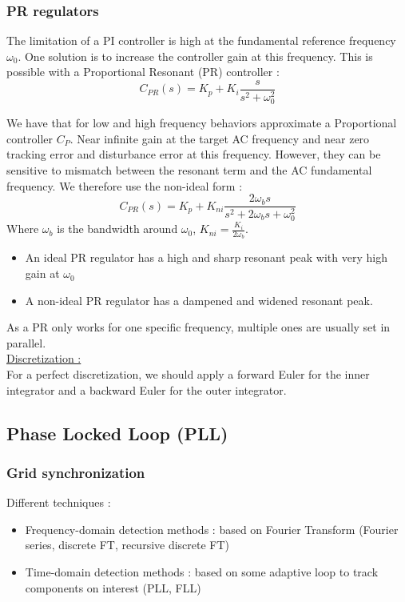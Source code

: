 \documentclass[../main.tex]{subfiles}
\begin{document}
\subsubsection{PR regulators}
The limitation of a PI controller is high at the fundamental reference frequency $\omega_0$. One solution is to increase the controller gain at this frequency. This is possible with a Proportional Resonant (PR) controller : \begin{equation}
    C_{PR}(s) = K_p + K_i \frac{s}{s^2 + \omega_0^2}
\end{equation}

We have that for low and high frequency behaviors approximate a Proportional controller $C_P$. Near infinite gain at the target AC frequency and near zero tracking error and disturbance error at this frequency. However, they can be sensitive to mismatch between the resonant term and the AC fundamental frequency. We therefore use the non-ideal form : \begin{equation}
    C_{PR} (s) = K_p + K_{ni} \frac{2 \omega_b s}{s^2 + 2\omega_b s + \omega_0^2}
\end{equation}
Where $\omega_b$ is the bandwidth around $\omega_0$, $K_{ni} = \frac{K_i}{2\omega_b}$.\\

\begin{itemize}
    \item An ideal PR regulator has a high and sharp resonant peak with very high gain at $\omega_0$
    \item A non-ideal PR regulator has a dampened and widened resonant peak.
\end{itemize}
As a PR only works for one specific frequency, multiple ones are usually set in parallel.\\

\quad \underline{Discretization :}\\
For a perfect discretization, we should apply a forward Euler for the inner integrator and a backward Euler for the outer integrator. 

\subsection{Phase Locked Loop (PLL)}

\subsubsection{Grid synchronization}
Different techniques :\begin{itemize}
    \item Frequency-domain detection methods : based on Fourier Transform (Fourier series, discrete FT, recursive discrete FT)
    \item Time-domain detection methods : based on some adaptive loop to track components on interest (PLL, FLL)
\end{itemize}
\end{document}
